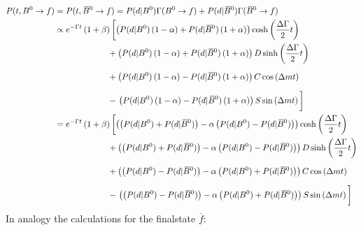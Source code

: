 \begin{align*}
    P(t,\Bz\to f)&= P(t,\Bzb\to f) =P(d|\Bz)\Gamma(\Bz\to f)+P(d|\Bzb)\Gamma(\Bzb\to f) \\
    &\propto e^{-\Gamma t}\left(1+\beta\right)\left[\left(P(d|\Bz)\left(1-\alpha\right)+P(d|\Bzb)\left(1+\alpha\right)\right)
    \cosh\left(\frac{\Delta \Gamma}{2}t\right)\right.\\
    &\hphantom{\propto e^{-\Gamma t}\left(1+\beta\right)}+\left(P(d|\Bz)\left(1-\alpha\right)+P(d|\Bzb)\left(1+\alpha\right)\right)
    D\sinh\left(\frac{\Delta \Gamma}{2}t\right)\\
    &\hphantom{\propto e^{-\Gamma t}\left(1+\beta\right)}+\left(P(d|\Bz)\left(1-\alpha\right)-P(d|\Bzb)\left(1+\alpha\right)\right)
    C\cos\left(\Delta mt\right)\vphantom{\cosh\left(\frac{\Delta \Gamma}{2}t\right)}\\
    &\hphantom{\propto e^{-\Gamma t}\left(1+\beta\right)}-\left.\left(P(d|\Bz)\left(1-\alpha\right)-P(d|\Bzb)\left(1+\alpha\right)\right)
    S\sin\left(\Delta mt\right)\vphantom{\cosh\left(\frac{\Delta \Gamma}{2}t\right)}\right]\\
    &=e^{-\Gamma t}\left(1+\beta\right)\left[\left(\left(P(d|\Bz)+P(d|\Bzb)\right)-\alpha\left(P(d|\Bz)-P(d|\Bzb)\right)\right)
    \cosh\left(\frac{\Delta \Gamma}{2}t\right)\right.\\
    &\hphantom{\propto e^{-\Gamma t}\left(1+\beta\right)}+\left(\left(P(d|\Bz)+P(d|\Bzb)\right)-\alpha\left(P(d|\Bz)-P(d|\Bzb)\right)\right)
    D\sinh\left(\frac{\Delta \Gamma}{2}t\right)\\
    &\hphantom{\propto e^{-\Gamma t}\left(1+\beta\right)}+\left(\left(P(d|\Bz)-P(d|\Bzb)\right)-\alpha\left(P(d|\Bz)+P(d|\Bzb)\right)\right)
    C\cos\left(\Delta mt\right)\vphantom{\cosh\left(\frac{\Delta \Gamma}{2}t\right)}\\
    &\hphantom{\propto e^{-\Gamma t}\left(1+\beta\right)}-\left.\left(\left(P(d|\Bz)-P(d|\Bzb)\right)-\alpha\left(P(d|\Bz)+P(d|\Bzb)\right)\right)
    S\sin\left(\Delta mt\right)\vphantom{\cosh\left(\frac{\Delta \Gamma}{2}t\right)}\right]
\end{align*}
In analogy the calculations for the finalstate $\overline{f}$:
